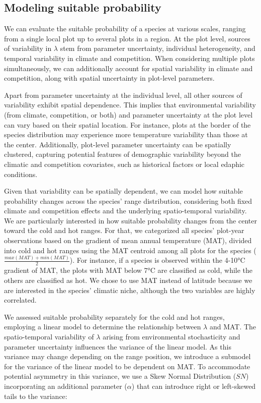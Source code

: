 \documentclass[12pt]{article}
\begin{document}
\hypertarget{modeling-suitable-probability}{%
\subsection{Modeling suitable
probability}\label{modeling-suitable-probability}}

We can evaluate the suitable probability of a species at various scales,
ranging from a single local plot up to several plots in a region. At the
plot level, sources of variability in \(\lambda\) stem from parameter
uncertainty, individual heterogeneity, and temporal variability in
climate and competition. When considering multiple plots simultaneously,
we can additionally account for spatial variability in climate and
competition, along with spatial uncertainty in plot-level parameters.

Apart from parameter uncertainty at the individual level, all other
sources of variability exhibit spatial dependence. This implies that
environmental variability (from climate, competition, or both) and
parameter uncertainty at the plot level can vary based on their spatial
location. For instance, plots at the border of the species distribution
may experience more temperature variability than those at the center.
Additionally, plot-level parameter uncertainty can be spatially
clustered, capturing potential features of demographic variability
beyond the climatic and competition covariates, such as historical
factors or local edaphic conditions.

Given that variability can be spatially dependent, we can model how
suitable probability changes across the species' range distribution,
considering both fixed climate and competition effects and the
underlying spatio-temporal variability. We are particularly interested
in how suitable probability changes from the center toward the cold and
hot ranges. For that, we categorized all species' plot-year observations
based on the gradient of mean annual temperature (MAT), divided into
cold and hot ranges using the MAT centroid among all plots for the
species (\(\frac{max(MAT) + min(MAT)}{2}\)). For instance, if a species
is observed within the 4-10°C gradient of MAT, the plots with MAT below
7°C are classified as cold, while the others are classified as hot. We
chose to use MAT instead of latitude because we are interested in the
species' climatic niche, although the two variables are highly
correlated.

We assessed suitable probability separately for the cold and hot ranges,
employing a linear model to determine the relationship between
\(\lambda\) and MAT. The spatio-temporal variability of \(\lambda\)
arising from environmental stochasticity and parameter uncertainty
influences the variance of the linear model. As this variance may change
depending on the range position, we introduce a submodel for the
variance of the linear model to be dependent on MAT. To accommodate
potential asymmetry in this variance, we use a Skew Normal Distribution
(\(SN\)) incorporating an additional parameter (\(\alpha\)) that can
introduce right or left-skewed tails to the variance:
\end{document}
